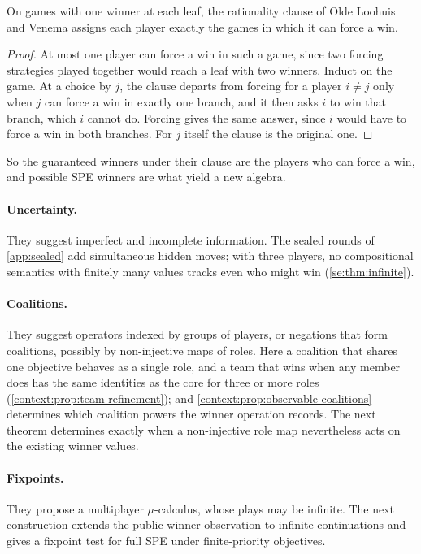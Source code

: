 \begin{proposition}\label{olv:prop:rational}
On games with one winner at each leaf, the rationality clause of Olde Loohuis and Venema \cite[Section~6]{OldeLoohuisVenema2010} assigns each player exactly the games in which it can force a win.
\end{proposition}
\begin{proof}
At most one player can force a win in such a game, since two forcing strategies played together would reach a leaf with two winners. Induct on the game. At a choice by $j$, the clause departs from forcing for a player $i\ne j$ only when $j$ can force a win in exactly one branch, and it then asks $i$ to win that branch, which $i$ cannot do. Forcing gives the same answer, since $i$ would have to force a win in both branches. For $j$ itself the clause is the original one.
\end{proof}

So the guaranteed winners under their clause are the players who can force a win, and possible SPE winners are what yield a new algebra.

\paragraph{Uncertainty.} They suggest imperfect and incomplete information. The sealed rounds of \cref{app:sealed} add simultaneous hidden moves; with three players, no compositional semantics with finitely many values tracks even who might win (\cref{se:thm:infinite}).

\paragraph{Coalitions.} They suggest operators indexed by groups of players, or negations that form coalitions, possibly by non-injective maps of roles. Here a coalition that shares one objective behaves as a single role, and a team that wins when any member does has the same identities as the core for three or more roles (\cref{context:prop:team-refinement}); and \cref{context:prop:observable-coalitions} determines which coalition powers the winner operation records. The next theorem determines exactly when a non-injective role map nevertheless acts on the existing winner values.



\paragraph{Fixpoints.} They propose a multiplayer $\mu$-calculus, whose plays may be infinite. The next construction extends the public winner observation to infinite continuations and gives a fixpoint test for full SPE under finite-priority objectives.

